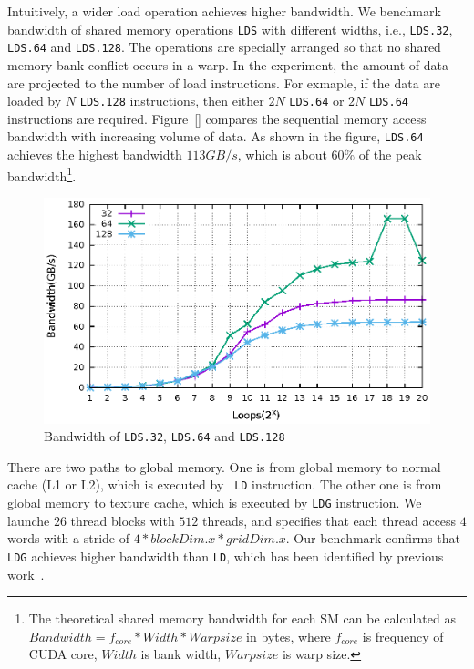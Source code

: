 \documentclass{sig-alternate-05-2015}
\begin{document}
Intuitively, a wider load operation achieves higher bandwidth. We benchmark bandwidth of shared memory operations {\tt LDS} with different widths, i.e., {\tt LDS.32}, {\tt LDS.64}
and {\tt LDS.128}. The operations are specially arranged so that no shared memory bank conflict occurs in a warp. In the experiment, the amount of data are projected to the number of load instructions. For exmaple, if the data are loaded by $N$ {\tt LDS.128} instructions, then either $2N$ {\tt LDS.64} or $2N$ {\tt LDS.64} instructions are required. Figure~\ref{} compares the sequential memory access bandwidth with increasing volume of data. As shown in the figure, {\tt LDS.64} achieves the highest bandwidth $113GB/s$, which is about $60\%$ of the peak bandwidth\footnote{The theoretical shared memory bandwidth for each SM can be calculated as $Bandwidth=f_{core}*Width*Warpsize$ in
bytes, where $f_{core}$ is frequency of CUDA core, $Width$ is bank width, $Warpsize$ is warp size.}.

\begin{figure}[htbp]
\begin{center}
\includegraphics[scale=0.6]{lds_bandwidth}
    \caption{ Bandwidth of {\tt LDS.32}, {\tt LDS.64} and {\tt LDS.128}}
\label{fig:lds_bw}
\end{center}
\end{figure}

There are two paths to global memory. One is from global memory to normal cache (L1 or L2), which is executed by {\tt
LD} instruction. The other one is from global memory to texture cache, which is executed by {\tt LDG} instruction. We
launche $26$ thread blocks with $512$ threads, and specifies that each thread access $4$ words with a stride of
$4*blockDim.x*gridDim.x$. Our benchmark confirms that {\tt LDG} achieves higher bandwidth than {\tt LD}, which has been
identified by previous work~\cite{tan}.
\end{document}

